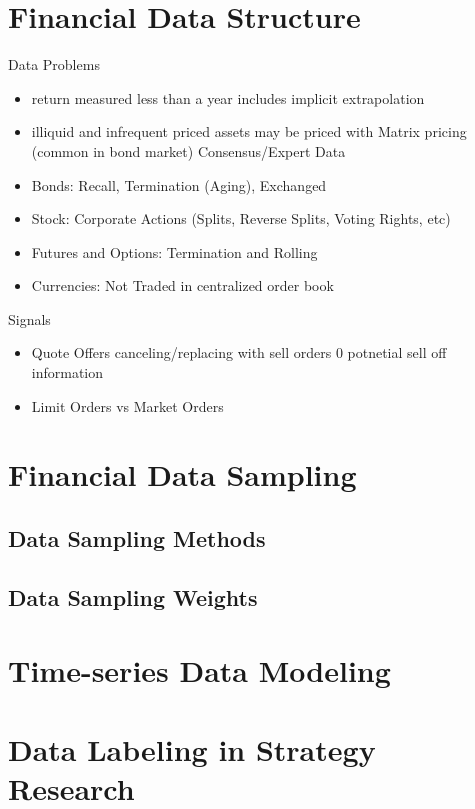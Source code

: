\documentclass[11pt, openany]{book}              %
\begin{document}
\section{Financial Data Structure}

Data Problems
\begin{itemize}
 \item return measured less than a year includes implicit extrapolation
 \item illiquid and infrequent priced assets may be priced with
 	\subitem Matrix pricing (common in bond market)
 	\subitem Consensus/Expert Data
 \item Bonds: Recall, Termination (Aging), Exchanged
 \item Stock: Corporate Actions (Splits, Reverse Splits, Voting Rights, etc)
 \item Futures and Options: Termination and Rolling
 \item Currencies: Not Traded in centralized order book 
\end{itemize}

Signals

\begin{itemize}
 \item Quote Offers canceling/replacing with sell orders 0 potnetial sell off information
 \item Limit Orders vs Market Orders 
\end{itemize}

\section{Financial Data Sampling}

\subsection{Data Sampling Methods}

\subsection{Data Sampling Weights}

\section{Time-series Data Modeling}

\section{Data Labeling in Strategy Research}
\end{document}
